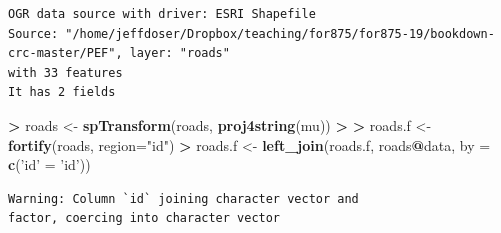 \documentclass[]{krantz}
\makeatletter
\newenvironment{Shaded}{\begin{snugshade}}{\end{snugshade}}
\newcommand{\DataTypeTok}[1]{\textcolor[rgb]{0.27,0.27,0.27}{#1}}
\newcommand{\ErrorTok}[1]{\textcolor[rgb]{0.14,0.14,0.14}{\textbf{#1}}}
\newcommand{\KeywordTok}[1]{\textcolor[rgb]{0.27,0.27,0.27}{\textbf{#1}}}
\newcommand{\NormalTok}[1]{#1}
\newcommand{\OperatorTok}[1]{\textcolor[rgb]{0.43,0.43,0.43}{\textbf{#1}}}
\newcommand{\StringTok}[1]{\textcolor[rgb]{0.5,0.5,0.5}{#1}}
\newenvironment{kframe}{%
\medskip{}
\setlength{\fboxsep}{.8em}
 \def\at@end@of@kframe{}%
 \ifinner\ifhmode%
  \def\at@end@of@kframe{\end{minipage}}%
  \begin{minipage}{\columnwidth}%
 \fi\fi%
 \def\FrameCommand##1{\hskip\@totalleftmargin \hskip-\fboxsep
 \colorbox{shadecolor}{##1}\hskip-\fboxsep
     \hskip-\linewidth \hskip-\@totalleftmargin \hskip\columnwidth}%
 \MakeFramed {\advance\hsize-\width
   \@totalleftmargin\z@ \linewidth\hsize
   \@setminipage}}%
 {\par\unskip\endMakeFramed%
 \at@end@of@kframe}
\renewenvironment{Shaded}{\begin{kframe}}{\end{kframe}}
\makeatother
\begin{document}
\begin{verbatim}
OGR data source with driver: ESRI Shapefile 
Source: "/home/jeffdoser/Dropbox/teaching/for875/for875-19/bookdown-crc-master/PEF", layer: "roads"
with 33 features
It has 2 fields
\end{verbatim}

\begin{Shaded}
\begin{Highlighting}[]
\OperatorTok{>}\StringTok{ }\NormalTok{roads <-}\StringTok{ }\KeywordTok{spTransform}\NormalTok{(roads, }\KeywordTok{proj4string}\NormalTok{(mu))}
\OperatorTok{>}\StringTok{ }
\ErrorTok{>}\StringTok{ }\NormalTok{roads.f <-}\StringTok{ }\KeywordTok{fortify}\NormalTok{(roads, }\DataTypeTok{region=}\StringTok{"id"}\NormalTok{)}
\OperatorTok{>}\StringTok{ }\NormalTok{roads.f <-}\StringTok{ }\KeywordTok{left_join}\NormalTok{(roads.f, roads}\OperatorTok{@}\NormalTok{data, }\DataTypeTok{by =} \KeywordTok{c}\NormalTok{(}\StringTok{'id'}\NormalTok{ =}\StringTok{ 'id'}\NormalTok{))}
\end{Highlighting}
\end{Shaded}

\begin{verbatim}
Warning: Column `id` joining character vector and
factor, coercing into character vector
\end{verbatim}
\end{document}
